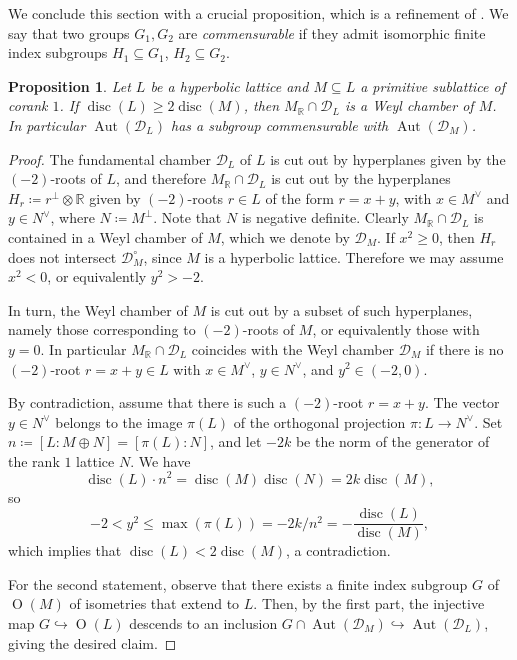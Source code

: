 \documentclass[11pt,letterpaper]{amsart}
\DeclareMathOperator{\Aut}{Aut}
\DeclareMathOperator{\disc}{disc}
\DeclareMathOperator{\Or}{O}
\newcommand{\RR}{\mathbb{R}}
\newcommand{\D}{\mathcal{D}}
\newtheorem{proposition}[theorem]{Proposition}
\theoremstyle{definition}
\theoremstyle{remark}
\begin{document}
We conclude this section with a crucial proposition, which is a refinement of \cite[Theorem~3.6]{mezzedimi.entropy}. We say that two groups $G_1,G_2$ are \emph{commensurable} if they admit isomorphic finite index subgroups $H_1\subseteq G_1$, $H_2\subseteq G_2$.

\begin{proposition}\label{prop:easy_fundamental_chamber}
Let $L$ be a hyperbolic lattice and $M\subseteq L$ a primitive sublattice of corank $1$. If $\disc(L)\ge 2\disc(M)$, then $M_\RR \cap \D_{L}$ is a Weyl chamber of $M$. In particular $\Aut(\D_L)$ has a subgroup commensurable with $\Aut(\D_M)$.
\end{proposition}
\begin{proof}
The fundamental chamber $\D_L$ of $L$ is cut out by hyperplanes given by the $(-2)$-roots of $L$, and therefore $M_\RR \cap \D_{L}$ is cut out by the hyperplanes $H_r \coloneqq r^\perp\otimes \RR$ given by $(-2)$-roots $r\in L$ of the form $r=x+y$, with $x\in M^\vee$ and $y\in N^\vee$, where $N\coloneqq M^\perp$. Note that $N$ is negative definite.
Clearly $M_\RR \cap \D_L$ is contained in a Weyl chamber of $M$, which we denote by $\D_M$.
If $x^2 \ge 0$, then $H_r$ does not intersect $\D_{M}^\circ$, since $M$ is a hyperbolic lattice. Therefore we may assume $x^2 < 0$, or equivalently $y^2>-2$.

In turn, the Weyl chamber of $M$ is cut out by a subset of such hyperplanes, namely those corresponding to $(-2)$-roots of $M$, or equivalently those with $y=0$. In particular $M_\RR \cap \D_{L}$ coincides with the Weyl chamber $\D_M$ if there is no $(-2)$-root $r=x+y\in L$ with $x\in M^\vee$, $y\in N^\vee$, and $y^2 \in (-2,0)$.

By contradiction, assume that there is such a $(-2)$-root $r=x+y$. The vector $y\in N^\vee$ belongs to the image $\pi(L)$ of the orthogonal projection $\pi: L \to N^\vee$. Set $n\coloneqq [L:M\oplus N] = [\pi(L):N]$, and let $-2k$ be the norm of the generator of the rank $1$ lattice $N$. We have \[\disc(L)\cdot n^2 = \disc(M)\disc(N)=2k \disc(M),\] so
$$-2 < y^2 \le \max(\pi(L)) = -2k/n^2  = -\frac{\disc(L)}{\disc(M)},$$
which implies that $\disc(L)< 2\disc(M)$, a contradiction.

For the second statement, observe that there exists a finite index subgroup $G$ of $\Or(M)$ of isometries that extend to $L$. Then, by the first part, the injective map $G\hookrightarrow \Or(L)$ descends to an inclusion $G \cap \Aut(\D_M)\hookrightarrow \Aut(\D_L)$, giving the desired claim.
\end{proof}
\end{document}
